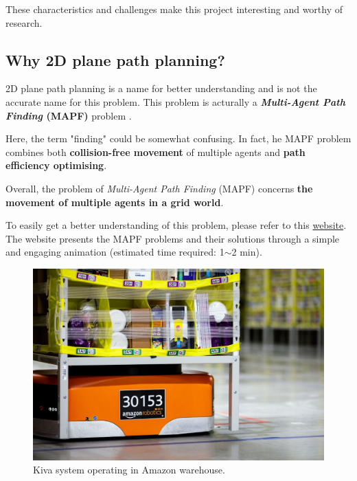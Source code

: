 These characteristics and challenges make this project interesting and worthy of research.


\subsection{Why 2D plane path planning?}

2D plane path planning is a name for better understanding and is not the accurate name for this problem.
This problem is acturally a \textbf{\textit{Multi-Agent Path Finding} (MAPF)} problem \cite{MAPF_Explain1, MAPF_Explain2}.

Here, the term "finding" could be somewhat confusing. 
In fact, he MAPF problem combines both \textbf{collision-free movement} of multiple agents and 
\textbf{path efficiency optimising}.

Overall, the problem of \textit{Multi-Agent Path Finding} (MAPF) concerns \textbf{the movement of multiple agents in a grid world}.

To easily get a better understanding of this problem, please refer to this \href{https://primalgrid.netlify.app/primal}{website}\footnotemark.
The website presents the MAPF problems and their solutions through a simple and engaging animation (estimated time required: 1$\sim$2 min).


\begin{figure}
    \centering
    \includegraphics[width=0.6\linewidth]{figures/Amazon_Warehouse.jpeg}
    \caption{Kiva system operating in Amazon warehouse\protect\footnotemark. }
    \label{fig:Amazon Warehouse Robots}
\end{figure}

